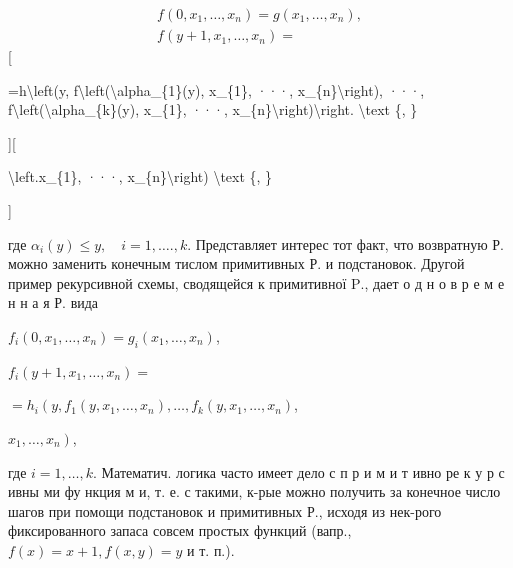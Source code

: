 \documentclass[10pt]{article}
\begin{document}
\[

\begin{gathered}

f\left(0, x_{1}, \ldots, x_{n}\right)=g\left(x_{1}, \ldots, x_{n}\right), \\

f\left(y+1, x_{1}, \ldots, x_{n}\right)=

\end{gathered}

\][



=h\textbackslash left(y, f\textbackslash left(\textbackslash alpha\_\{1\}(y), x\_\{1\}, ···, x\_\{n\}\textbackslash right), ···, f\textbackslash left(\textbackslash alpha\_\{k\}(y), x\_\{1\}, ···, x\_\{n\}\textbackslash right)\textbackslash right. \textbackslash text \{, \}



][



\textbackslash left.x\_\{1\}, ···, x\_\{n\}\textbackslash right) \textbackslash text \{, \}

]



где $\alpha_{i}(y) \leqslant y, \quad i=1, \ldots ., k$. Представляет интерес тот факт, что возвратную Р. можно заменить конечным тислом примитивных Р. и подстановок. Другой пример рекурсивной схемы, сводящейся к примитивної $\mathrm{P}$., дает о д н о в р е м е н н а я Р. вида



$f_{i}\left(0, x_{1}, \ldots, x_{n}\right)=g_{i}\left(x_{1}, \ldots, x_{n}\right)$,



$f_{i}\left(y+1, x_{1}, \ldots, x_{n}\right)=$



$=h_{i}\left(y, f_{1}\left(y, x_{1}, \ldots, x_{n}\right), \ldots, f_{k}\left(y, x_{1}, \ldots, x_{n}\right)\right.$,



$\left.x_{1}, \ldots, x_{n}\right)$,



где $i=1, \ldots, k$. Математич. логика часто имеет дело с п р и м и т ивно ре к у р с ивны ми фу нкция м и, т. е. с такими, к-рые можно получить за конечное число шагов при помощи подстановок и примитивных Р., исходя из нек-рого фиксированного запаса совсем простых функций (вапр., $f(x)=x+1, f(x, y)=y$ и т. п.).
\end{document}
